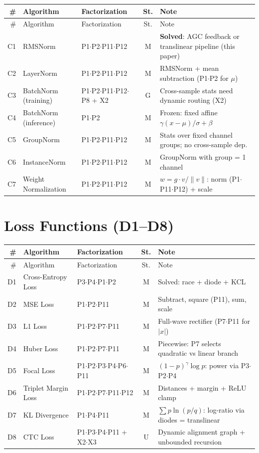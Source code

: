 \documentclass[10pt]{article}
\begin{document}
\begin{longtable}{rlp{3.0cm}cp{4.8cm}}
\toprule
\# & Algorithm & Factorization & St. & Note \\
\midrule
\endfirsthead
\toprule
\# & Algorithm & Factorization & St. & Note \\
\midrule
\endhead
\bottomrule
\endfoot
C1 & RMSNorm & P1$\cdot$P2$\cdot$P11$\cdot$P12 & M & \textbf{Solved}: AGC feedback or translinear pipeline (this paper) \\
C2 & LayerNorm & P1$\cdot$P2$\cdot$P11$\cdot$P12 & M & RMSNorm + mean subtraction (P1$\cdot$P2 for $\mu$) \\
C3 & BatchNorm (training) & P1$\cdot$P2$\cdot$P11$\cdot$P12$\cdot$P8 + X2 & G & Cross-sample stats need dynamic routing (X2) \\
C4 & BatchNorm (inference) & P1$\cdot$P2 & M & Frozen: fixed affine $\gamma(x-\mu)/\sigma + \beta$ \\
C5 & GroupNorm & P1$\cdot$P2$\cdot$P11$\cdot$P12 & M & Stats over fixed channel groups; no cross-sample dep. \\
C6 & InstanceNorm & P1$\cdot$P2$\cdot$P11$\cdot$P12 & M & GroupNorm with group = 1 channel \\
C7 & Weight Normalization & P1$\cdot$P2$\cdot$P11$\cdot$P12 & M & $w = g \cdot v / \|v\|$: norm (P1$\cdot$P11$\cdot$P12) + scale \\
\end{longtable}

\section{Loss Functions (D1--D8)}

\begin{longtable}{rlp{3.0cm}cp{4.8cm}}
\toprule
\# & Algorithm & Factorization & St. & Note \\
\midrule
\endfirsthead
\toprule
\# & Algorithm & Factorization & St. & Note \\
\midrule
\endhead
\bottomrule
\endfoot
D1 & Cross-Entropy Loss & P3$\cdot$P4$\cdot$P1$\cdot$P2 & M & Solved: race + diode + KCL \\
D2 & MSE Loss & P1$\cdot$P2$\cdot$P11 & M & Subtract, square (P11), sum, scale \\
D3 & L1 Loss & P1$\cdot$P2$\cdot$P7$\cdot$P11 & M & Full-wave rectifier (P7$\cdot$P11 for $|x|$) \\
D4 & Huber Loss & P1$\cdot$P2$\cdot$P7$\cdot$P11 & M & Piecewise: P7 selects quadratic vs linear branch \\
D5 & Focal Loss & P1$\cdot$P2$\cdot$P3$\cdot$P4$\cdot$P6$\cdot$P11 & M & $(1-p)^\gamma \log p$: power via P3$\cdot$P2$\cdot$P4 \\
D6 & Triplet Margin Loss & P1$\cdot$P2$\cdot$P7$\cdot$P11$\cdot$P12 & M & Distances + margin + ReLU clamp \\
D7 & KL Divergence & P1$\cdot$P4$\cdot$P11 & M & $\sum p \ln(p/q)$: log-ratio via diodes = translinear \\
D8 & CTC Loss & P1$\cdot$P3$\cdot$P4$\cdot$P11 + X2$\cdot$X3 & U & Dynamic alignment graph + unbounded recursion \\
\end{longtable}
\end{document}
